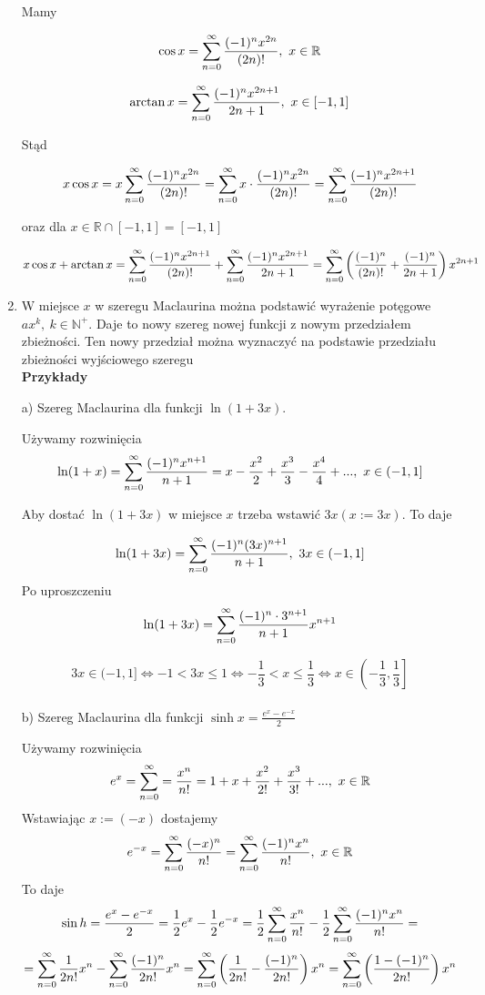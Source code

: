 \begin{enumerate}
    Mamy

    $$ \cos x = \sum\limits_{n = 0}^{\infty} \frac{(-1)^n x^{2n}}{(2n)!}, \ x \in \mathbb{R} $$

    $$ \arctan x = \sum\limits_{n = 0}^{\infty} \frac{(-1)^n x^{2n+1}}{2n+1}, \ x \in [-1, 1] $$

    Stąd

    $$ x \cos x = x \sum\limits_{n = 0}^{\infty} \frac{(-1)^n x^{2n}}{(2n)!} = \sum\limits_{n = 0}^{\infty} x \cdot \frac{(-1)^n x^{2n}}{(2n)!} 
    = \sum\limits_{n = 0}^{\infty} \frac{(-1)^n x^{2n+1}}{(2n)!}$$

    oraz dla $ x \in \mathbb{R} \cap [-1, 1] = [-1, 1] $

    $$ x \cos x + \arctan x = \sum\limits_{n = 0}^{\infty} \frac{(-1)^n x^{2n+1}}{(2n)!} + \sum\limits_{n = 0}^{\infty} \frac{(-1)^n x^{2n+1}}{2n+1} = 
    \sum\limits_{n = 0}^{\infty} \left( \frac{(-1)^n}{(2n)!} + \frac{(-1)^n}{2n+1} \right) x^{2n+1} $$ 

    \item W miejsce $x$ w szeregu Maclaurina można podstawić wyrażenie potęgowe $ ax^k, \ k \in \mathbb{N}^+ $.
    Daje to nowy szereg nowej funkcji z nowym przedziałem zbieżności. Ten nowy przedział można wyznaczyć na podstawie
    przedziału zbieżności wyjściowego szeregu \\

    \textbf{Przykłady} 

    a) Szereg Maclaurina dla funkcji $ \ln (1+3x) $.

    Używamy rozwinięcia 
    $$ \ln (1+x) = \sum\limits_{n = 0}^{\infty} \frac{(-1)^n x^{n+1}}{n+1} = x - \frac{x^2}{2} + \frac{x^3}{3} - \frac{x^4}{4} + ... , \ x \in (-1, 1] $$

    Aby dostać $ \ln(1+3x) $ w miejsce $x$ trzeba wstawić $ 3x ( x := 3x)$. To daje

    $$ \ln(1+3x) = \sum\limits_{n = 0}^{\infty} \frac{(-1)^n (3x)^{n+1}}{n+1}, \ 3x \in (-1, 1] $$
    Po uproszczeniu 
    $$ \ln(1+3x) = \sum\limits_{n = 0}^{\infty} \frac{(-1)^n \cdot 3^{n+1}}{n+1} x^{n+1} $$

    $$ 3x \in (-1, 1] \Leftrightarrow -1 < 3x \leq 1 \Leftrightarrow -\frac{1}{3} < x \leq \frac{1}{3} \Leftrightarrow x \in \left( -\frac{1}{3}, \frac{1}{3} \right] $$ \\

    b) Szereg Maclaurina dla funkcji $ \sinh x = \frac{e^x - e^{-x}}{2} $

    Używamy rozwinięcia
    $$ e^x = \sum\limits_{n = 0}^{\infty} = \frac{x^n}{n!} = 1 + x + \frac{x^2}{2!} + \frac{x^3}{3!} + ... , \ x \in \mathbb{R} $$
    Wstawiając $ x:=(-x) $ dostajemy 
    $$ e^{-x} = \sum\limits_{n = 0}^{\infty} \frac{(-x)^n}{n!} = \sum\limits_{n = 0}^{\infty} \frac{(-1)^n x^n}{n!}, \ x \in \mathbb{R} $$
    To daje
    $$ \sin h = \frac{e^x - e^{-x}}{2} = \frac{1}{2}e^x - \frac{1}{2}e^{-x} =
    \frac{1}{2} \sum\limits_{n = 0}^{\infty} \frac{x^n}{n!} - \frac{1}{2} \sum\limits_{n = 0}^{\infty} \frac{(-1)^n x^n}{n!} 
    =$$ $$ =  \sum\limits_{n = 0}^{\infty} \frac{1}{2n!} x^n - \sum\limits_{n = 0}^{\infty} \frac{(-1)^n}{2n!} x^n
    = \sum\limits_{n = 0}^{\infty} \left( \frac{1}{2n!} - \frac{(-1)^n}{2n!} \right) x^n 
    = \sum\limits_{n = 0}^{\infty} \left( \frac{1 - (-1)^n}{2n!} \right) x^n $$


\end{enumerate}
